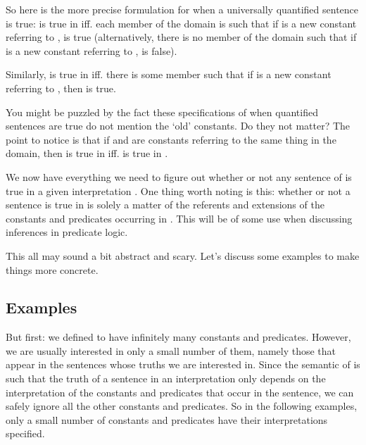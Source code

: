 So here is the more precise formulation for when a universally quantified 
sentence is true: \p{\lforall \upsilon \phi(\upsilon)} is true in \model{} iff.  
each member  of the domain is such that if \p{\kappa} is a new 
constant referring to , \p{\phi(\kappa)} is true (alternatively,
there is no member  of the domain such that if \p{\kappa} is a 
new constant referring to , \p{\phi(\kappa)} is false).

Similarly, \p{\lthereis \upsilon \phi(\upsilon)} is true in \model{} iff. there 
is some member  such that if \p{\kappa} is a new constant 
referring to , then \p{\phi(\kappa)} is true.

You might be puzzled by the fact these specifications of when quantified 
sentences are true do not mention the `old' constants. Do they not matter? The 
point to notice is that if  and  are constants referring 
to the same thing in the domain, then  is true in \model{} 
iff.  is true in \model{}.

We now have everything we need to figure out whether or not  any sentence of 
\lL[Q]{} is true in a given interpretation \model. One thing worth noting is 
this: whether or not a sentence  is true in \model{} is solely a matter of 
the referents and extensions of the constants and predicates occurring in .  
This will be of some use when discussing inferences in predicate logic.

 This all may  sound a bit  abstract and scary. Let's discuss some examples to 
 make things more concrete.

\subsection{Examples}

But first: we defined \lL[Q]{} to have infinitely many constants and predicates.  
However, we are usually interested in only a small number of them, namely those 
that appear in the sentences whose truths we are interested in. Since the 
semantic of \lL[Q]{} is such that the truth of a sentence in an interpretation 
only depends on the interpretation of the constants and predicates that occur in 
the sentence, we can safely ignore all the other constants and predicates. So in 
the following examples, only a small number of constants and predicates have 
their interpretations specified.

